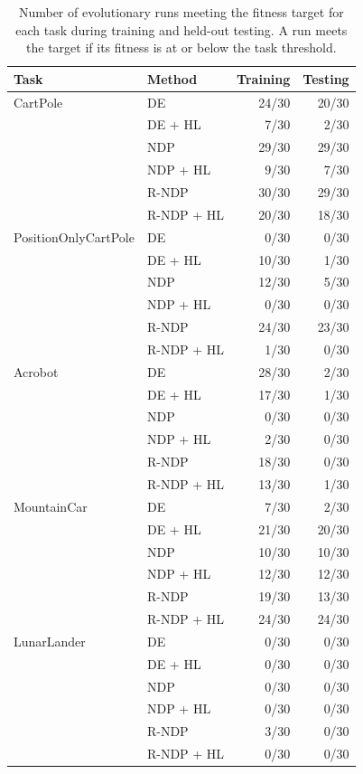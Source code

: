 \begin{table}[t]
\centering
\caption{Number of evolutionary runs meeting the fitness target for each task during training and held-out testing. A run meets the target if its fitness is at or below the task threshold.}
\label{tab:target-attainment}
\begin{tabular}{llrr}
\toprule
Task & Method & Training & Testing \\
\midrule
CartPole & DE & 24/30 & 20/30 \\
 & DE + HL & 7/30 & 2/30 \\
 & NDP & 29/30 & 29/30 \\
 & NDP + HL & 9/30 & 7/30 \\
 & R-NDP & 30/30 & 29/30 \\
 & R-NDP + HL & 20/30 & 18/30 \\
\addlinespace
PositionOnlyCartPole & DE & 0/30 & 0/30 \\
 & DE + HL & 10/30 & 1/30 \\
 & NDP & 12/30 & 5/30 \\
 & NDP + HL & 0/30 & 0/30 \\
 & R-NDP & 24/30 & 23/30 \\
 & R-NDP + HL & 1/30 & 0/30 \\
\addlinespace
Acrobot & DE & 28/30 & 2/30 \\
 & DE + HL & 17/30 & 1/30 \\
 & NDP & 0/30 & 0/30 \\
 & NDP + HL & 2/30 & 0/30 \\
 & R-NDP & 18/30 & 0/30 \\
 & R-NDP + HL & 13/30 & 1/30 \\
\addlinespace
MountainCar & DE & 7/30 & 2/30 \\
 & DE + HL & 21/30 & 20/30 \\
 & NDP & 10/30 & 10/30 \\
 & NDP + HL & 12/30 & 12/30 \\
 & R-NDP & 19/30 & 13/30 \\
 & R-NDP + HL & 24/30 & 24/30 \\
\addlinespace
LunarLander & DE & 0/30 & 0/30 \\
 & DE + HL & 0/30 & 0/30 \\
 & NDP & 0/30 & 0/30 \\
 & NDP + HL & 0/30 & 0/30 \\
 & R-NDP & 3/30 & 0/30 \\
 & R-NDP + HL & 0/30 & 0/30 \\
\bottomrule
\end{tabular}
\end{table}
